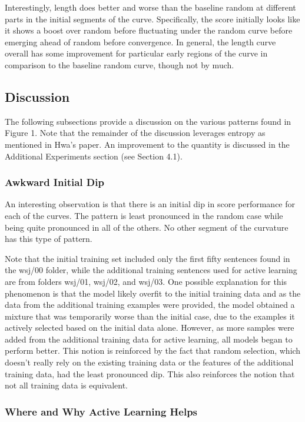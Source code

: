 \documentclass{article} %
\begin{document}
Interestingly, length does better and worse than the baseline random at different parts in the initial segments of the curve. Specifically, the score initially looks like it shows a boost over random before fluctuating under the random curve before emerging ahead of random before convergence. In general, the length curve overall has some improvement for particular early regions of the curve in comparison to the baseline random curve, though not by much.

\subsection{Discussion}

The following subsections provide a discussion on the various patterns found in Figure 1. Note that the remainder of the discussion leverages entropy as mentioned in Hwa's paper. An improvement to the quantity is discussed in the Additional Experiments section (see Section 4.1).

\subsubsection{Awkward Initial Dip}

An interesting observation is that there is an initial dip in score performance for each of the  curves. The pattern is least pronounced in the random case while being quite pronounced in all of the others. No other segment of the curvature has this type of pattern.

Note that the initial training set included only the first fifty sentences found in the wsj/00 folder, while the additional training sentences used for active learning are from folders wsj/01, wsj/02, and wsj/03. One possible explanation for this phenomenon is that the model likely overfit to the initial training data and as the data from the additional training examples were provided, the model obtained a mixture that was temporarily worse than the initial case, due to the examples it actively selected based on the initial data alone. However, as more samples were added from the additional training data for active learning, all models began to perform better. This notion is reinforced by the fact that random selection, which doesn't really rely on the existing training data or the features of the additional training data, had the least pronounced dip. This also reinforces the notion that not all training data is equivalent.

\subsubsection{Where and Why Active Learning Helps}
\end{document}
